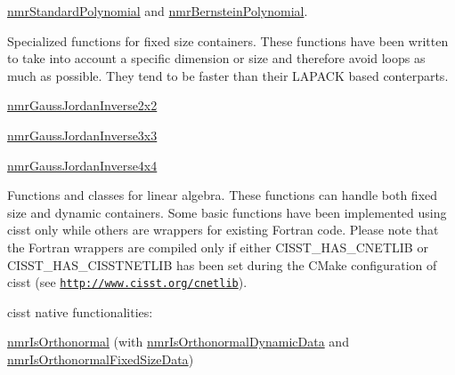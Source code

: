 \begin{DoxyItemize}
\item \hyperlink{classnmr_standard_polynomial}{nmr\+Standard\+Polynomial} and \hyperlink{classnmr_bernstein_polynomial}{nmr\+Bernstein\+Polynomial}.
\item Specialized functions for fixed size containers. These functions have been written to take into account a specific dimension or size and therefore avoid loops as much as possible. They tend to be faster than their L\+A\+P\+A\+C\+K based conterparts. 
\begin{DoxyItemize}
\item \hyperlink{nmr_gauss_jordan_inverse_8h_ab5dda1fde91bd26409f59f9f95a0e1b9}{nmr\+Gauss\+Jordan\+Inverse2x2} 
\item \hyperlink{nmr_gauss_jordan_inverse_8h_aeec861fd603b96fb70b273d08f43988e}{nmr\+Gauss\+Jordan\+Inverse3x3} 
\item \hyperlink{nmr_gauss_jordan_inverse_8h_a62812caf23e8c98ce54b4ecb6496ab4c}{nmr\+Gauss\+Jordan\+Inverse4x4} 
\end{DoxyItemize}
\item Functions and classes for linear algebra. These functions can handle both fixed size and dynamic containers. Some basic functions have been implemented using cisst only while others are wrappers for existing Fortran code. Please note that the Fortran wrappers are compiled only if either C\+I\+S\+S\+T\+\_\+\+H\+A\+S\+\_\+\+C\+N\+E\+T\+L\+I\+B or C\+I\+S\+S\+T\+\_\+\+H\+A\+S\+\_\+\+C\+I\+S\+S\+T\+N\+E\+T\+L\+I\+B has been set during the C\+Make configuration of cisst (see \href{http://www.cisst.org/cnetlib}{\tt http\+://www.\+cisst.\+org/cnetlib}). 
\begin{DoxyItemize}
\item cisst native functionalities\+: 
\begin{DoxyItemize}
\item \hyperlink{nmr_is_orthonormal_8h_acf0ff1e2dbe0c988db04d9db1e2e7697}{nmr\+Is\+Orthonormal} (with \hyperlink{classnmr_is_orthonormal_dynamic_data}{nmr\+Is\+Orthonormal\+Dynamic\+Data} and \hyperlink{classnmr_is_orthonormal_fixed_size_data}{nmr\+Is\+Orthonormal\+Fixed\+Size\+Data}) 
\end{DoxyItemize}



\end{DoxyItemize}
\end{DoxyItemize}
